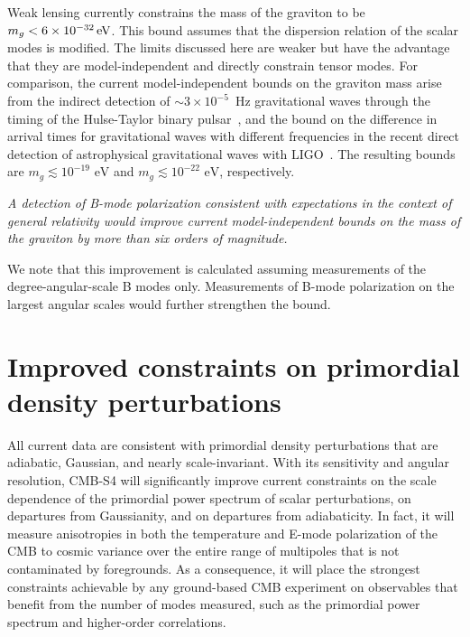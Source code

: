 Weak lensing currently constrains the mass of the graviton to be $m_g<6\times 10^{-32}\,{\rm eV}$. This bound assumes that the dispersion relation of the scalar modes is modified. The limits discussed here are weaker but have the advantage that they are model-independent and directly constrain tensor modes. For comparison, the current model-independent bounds on the graviton mass arise from the indirect detection of $\sim 3\times 10^{-5}$~Hz gravitational waves through the timing of the Hulse-Taylor binary pulsar~\cite{Finn:2001qi}, and the bound on the difference in arrival times for gravitational waves with different frequencies in the recent direct detection of astrophysical gravitational waves with LIGO~\cite{Abbott:2016blz}. The resulting bounds are $m_g\lesssim 10^{-19}{\mbox{ eV}}$ and \mbox{$m_g\lesssim 10^{-22}{\mbox{ eV}}$}, respectively.  

{\it A detection of B-mode polarization consistent with expectations in the context of general relativity would improve current model-independent bounds on the mass of the graviton by more than six orders of magnitude.} 

We note that this improvement is calculated assuming measurements of the degree-angular-scale B modes only. Measurements of B-mode polarization on the largest angular scales would further strengthen the bound. 



\section{Improved constraints on primordial density perturbations}
\label{sec:scalar}
All current data are consistent with primordial density perturbations that are adiabatic, Gaussian, and nearly scale-invariant. With its sensitivity and angular resolution, CMB-S4 will significantly improve current constraints on the scale dependence of the primordial power spectrum of scalar perturbations, on departures from Gaussianity, and on departures from adiabaticity. In fact, it will measure anisotropies in both the temperature and E-mode polarization of the CMB to cosmic variance over the entire range of multipoles that is not contaminated by foregrounds. As a consequence, it will place the strongest constraints achievable by any ground-based CMB experiment on observables that benefit from the number of modes measured, such as the primordial power spectrum and higher-order correlations.

